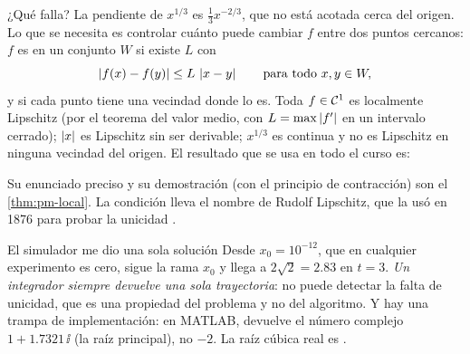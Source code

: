 ¿Qué falla? La pendiente de $x^{1/3}$ es $\tfrac13x^{-2/3}$, que no está acotada cerca del origen. Lo que se necesita es controlar cuánto puede cambiar $f$ entre dos puntos cercanos: $f$ es  en un conjunto $W$ si existe $L$ con
\[
  \left\lvert f(x)-f(y)\right\rvert\le L\,\left\lvert x-y\right\rvert\qquad\text{para todo }x,y\in W ,
\]
y  si cada punto tiene una vecindad donde lo es. Toda $f\in\mathcal{C}^{1}$ es localmente Lipschitz (por el teorema del valor medio, con $L=\max\left\lvert f'\right\rvert$ en un intervalo cerrado); $\left\lvert x\right\rvert$ es Lipschitz sin ser derivable; $x^{1/3}$ es continua y no es Lipschitz en ninguna vecindad del origen. El resultado que se usa en todo el curso es:
\begin{center}
\fbox{\parbox{0.9\linewidth}{\centering si $f$ es localmente Lipschitz, por cada $x_0$ pasa una única solución, definida en un intervalo $[0,\delta)$.}}
\end{center}
Su enunciado preciso y su demostración (con el principio de contracción) son el \cref{thm:pm-local}. La condición lleva el nombre de Rudolf Lipschitz, que la usó en 1876 para probar la unicidad \citep{Lip1876}.

\begin{trampa}[label=tr:un-raiz]{El simulador me dio una sola solución}
Desde $x_0=10^{-12}$, que en cualquier experimento es cero,  sigue la rama $x_0$ y llega a $2\sqrt2=2.83$ en $t=3$. \emph{Un integrador siempre devuelve una sola trayectoria}: no puede detectar la falta de unicidad, que es una propiedad del problema y no del algoritmo. Y hay una trampa de implementación: en MATLAB,  devuelve el número complejo $1+1.7321\,\ii$ (la raíz principal), no $-2$. La raíz cúbica real es .
\end{trampa}

